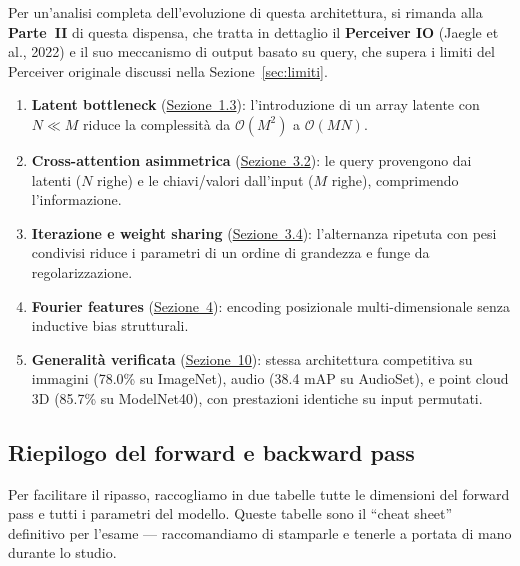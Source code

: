 \documentclass[12pt,a4paper]{article}
\begin{document}
Per un'analisi completa dell'evoluzione di questa architettura, si rimanda alla \textbf{Parte~II} di questa dispensa, che tratta in dettaglio il \textbf{Perceiver IO} (Jaegle et al., 2022) e il suo meccanismo di output basato su query, che supera i limiti del Perceiver originale discussi nella Sezione~\ref{sec:limiti}.


\begin{enumerate}[label=\arabic*.]
    \item \textbf{Latent bottleneck} (\hyperref[sec:latent_bottleneck]{Sezione~1.3}): l'introduzione di un array latente con $N \ll M$ riduce la complessit\`a da $\mathcal{O}(M^2)$ a $\mathcal{O}(MN)$.

    \item \textbf{Cross-attention asimmetrica} (\hyperref[sec:cross_attention]{Sezione~3.2}): le query provengono dai latenti ($N$ righe) e le chiavi/valori dall'input ($M$ righe), comprimendo l'informazione.

    \item \textbf{Iterazione e weight sharing} (\hyperref[sec:iterative]{Sezione~3.4}): l'alternanza ripetuta con pesi condivisi riduce i parametri di un ordine di grandezza e funge da regolarizzazione.

    \item \textbf{Fourier features} (\hyperref[sec:fourier]{Sezione~4}): encoding posizionale multi-dimensionale senza inductive bias strutturali.

    \item \textbf{Generalit\`a verificata} (\hyperref[sec:esperimenti]{Sezione~10}): stessa architettura competitiva su immagini (78.0\% su ImageNet), audio (38.4 mAP su AudioSet), e point cloud 3D (85.7\% su ModelNet40), con prestazioni identiche su input permutati.
\end{enumerate}

\subsection{Riepilogo del forward e backward pass} \label{sec:riepilogo_fb}

Per facilitare il ripasso, raccogliamo in due tabelle tutte le dimensioni del forward pass e tutti i parametri del modello. Queste tabelle sono il ``cheat sheet'' definitivo per l'esame --- raccomandiamo di stamparle e tenerle a portata di mano durante lo studio.
\end{document}
